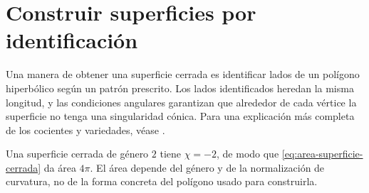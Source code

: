 \section{Construir superficies por identificación}

Una manera de obtener una superficie cerrada es identificar lados de un polígono hiperbólico según un patrón prescrito. Los lados identificados heredan la misma longitud, y las condiciones angulares garantizan que alrededor de cada vértice la superficie no tenga una singularidad cónica. Para una explicación más completa de los cocientes y variedades, véase \cite{ratcliffe2006}.

\begin{example}
Una superficie cerrada de género \(2\) tiene \(\chi=-2\), de modo que \cref{eq:area-superficie-cerrada} da área \(4\pi\). El área depende del género y de la normalización de curvatura, no de la forma concreta del polígono usado para construirla.
\end{example}
